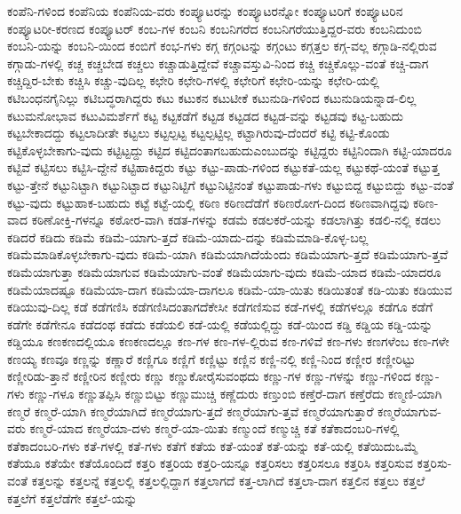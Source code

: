 {ಕಂಪೆನಿ-ಗಳಿಂದ
ಕಂಪೆನಿಯ
ಕಂಪೆನಿಯ-ವರು
ಕಂಪ್ಯೂಟರನ್ನು
ಕಂಪ್ಯೂಟರನ್ನೋ
ಕಂಪ್ಯೂಟರಿಗೆ
ಕಂಪ್ಯೂಟರಿನ
ಕಂಪ್ಯೂಟರೀ-ಕರಣದ
ಕಂಪ್ಯೂಟರ್
ಕಂಬ-ಗಳ
ಕಂಬನಿ
ಕಂಬನಿಗರೆದ
ಕಂಬನಿಗರೆಯುತ್ತಿದ್ದರ-ವರು
ಕಂಬನಿದುಂಬಿ
ಕಂಬನಿ-ಯನ್ನು
ಕಂಬನಿ-ಯಿಂದ
ಕಂಬಿಗೆ
ಕಂಭ-ಗಳು
ಕಗ್ಗ
ಕಗ್ಗಂಟನ್ನು
ಕಗ್ಗಂಟು
ಕಗ್ಗತ್ತಲ
ಕಗ್ಗ-ವಲ್ಲ
ಕಗ್ಗಾಡಿ-ನಲ್ಲಿರುವ
ಕಗ್ಗಾಡು-ಗಳಲ್ಲಿ
ಕಚ್ಚ
ಕಚ್ಚಬೇಡ
ಕಚ್ಚಲು
ಕಚ್ಚಾಡುತ್ತಿದ್ದೇವೆ
ಕಚ್ಚಾವಸ್ತುವಿ-ನಿಂದ
ಕಚ್ಚಿ
ಕಚ್ಚಿಕೊಲ್ಲು-ವಂತೆ
ಕಚ್ಚಿ-ದಾಗ
ಕಚ್ಚಿದ್ದಿರ-ಬೇಕು
ಕಚ್ಚಿಸಿ
ಕಚ್ಚು-ವುದಿಲ್ಲ
ಕಛೇರಿ
ಕಛೇರಿ-ಗಳಲ್ಲಿ
ಕಛೇರಿಗೆ
ಕಛೇರಿ-ಯನ್ನು
ಕಛೇರಿ-ಯಲ್ಲಿ
ಕಟಿಬಂಧನಗೈನಿಲ್ಲು
ಕಟಿಬದ್ಧರಾಗಿದ್ದರು
ಕಟು
ಕಟುಕನ
ಕಟುಟೀಕೆ
ಕಟುನುಡಿ-ಗಳಿಂದ
ಕಟುನುಡಿಯನ್ನಾಡ-ಲಿಲ್ಲ
ಕಟುಮನೋಭಾವ
ಕಟುವಿಮರ್ಶೆಗೆ
ಕಟ್ಟ
ಕಟ್ಟಕಡೆಗೆ
ಕಟ್ಟಡ
ಕಟ್ಟಡದ
ಕಟ್ಟಡ-ವನ್ನು
ಕಟ್ಟಡವು
ಕಟ್ಟ-ಬಹುದು
ಕಟ್ಟಬೇಕಾದದ್ದು
ಕಟ್ಟಲಾದೀತೇ
ಕಟ್ಟಲು
ಕಟ್ಟಲ್ಪಟ್ಟ
ಕಟ್ಟಲ್ಪಟ್ಟಿಲ್ಲ
ಕಟ್ಟಾಗಿರುವು-ದೆಂದರೆ
ಕಟ್ಟಿ
ಕಟ್ಟಿ-ಕೊಂಡು
ಕಟ್ಟಿಕೊಳ್ಳಬೇಕಾಗು-ವುದು
ಕಟ್ಟಿಟ್ಟದ್ದು
ಕಟ್ಟಿದ
ಕಟ್ಟಿದಂತಾಗಬಹುದುಎಂಬುದನ್ನು
ಕಟ್ಟಿದ್ದರು
ಕಟ್ಟಿನಿಂದಾಗಿ
ಕಟ್ಟಿ-ಯಾದರೂ
ಕಟ್ಟಿವೆ
ಕಟ್ಟಿಸಲು
ಕಟ್ಟಿಸಿ-ದ್ದೇನೆ
ಕಟ್ಟಿಹಾಕಿದ್ದರು
ಕಟ್ಟು
ಕಟ್ಟು-ಪಾಡು-ಗಳಿಂದ
ಕಟ್ಟುಕತೆ-ಯಲ್ಲ
ಕಟ್ಟುಕಥೆ-ಯಂತೆ
ಕಟ್ಟುತ್ತ
ಕಟ್ಟು-ತ್ತೇನೆ
ಕಟ್ಟುನಿಟ್ಟಾಗಿ
ಕಟ್ಟುನಿಟ್ಟಾದ
ಕಟ್ಟುನಿಟ್ಟಿಗೆ
ಕಟ್ಟುನಿಟ್ಟಿನಂತೆ
ಕಟ್ಟುಪಾಡು-ಗಳು
ಕಟ್ಟುಬಿದ್ದ
ಕಟ್ಟುಬಿದ್ದು
ಕಟ್ಟು-ವಂತೆ
ಕಟ್ಟು-ವುದು
ಕಟ್ಟುಹಾಕ-ಬಹುದು
ಕಟ್ಟೆ
ಕಟ್ಟೆ-ಯಲ್ಲಿ
ಕಠಿಣ
ಕಠಿಣದೆಡೆಗೆ
ಕಠಿಣರೋಗ-ದಿಂದ
ಕಠಿಣವಾಗಿದ್ದವು
ಕಠಿಣ-ವಾದ
ಕಠಿಣೋಕ್ತಿ-ಗಳನ್ನೂ
ಕಠೋರ-ವಾಗಿ
ಕಡತ-ಗಳನ್ನು
ಕಡಮೆ
ಕಡಲಕರೆ-ಯನ್ನು
ಕಡಲಾಗಿತ್ತು
ಕಡಲಿ-ನಲ್ಲಿ
ಕಡಲು
ಕಡಿದರೆ
ಕಡಿದು
ಕಡಿಮೆ
ಕಡಿಮೆ-ಯಾಗು-ತ್ತದೆ
ಕಡಿಮೆ-ಯಾದು-ದನ್ನು
ಕಡಿಮೆಮಾಡಿ-ಕೊಳ್ಳ-ಬಲ್ಲ
ಕಡಿಮೆಮಾಡಿಕೊಳ್ಳಬೇಕಾಗು-ವುದು
ಕಡಿಮೆ-ಯಾಗಿ
ಕಡಿಮೆಯಾಗಿದೆಯೆಂದು
ಕಡಿಮೆಯಾಗು-ತ್ತದೆ
ಕಡಿಮೆಯಾಗು-ತ್ತವೆ
ಕಡಿಮೆಯಾಗುತ್ತಾ
ಕಡಿಮೆಯಾಗುವ
ಕಡಿಮೆಯಾಗು-ವಂತೆ
ಕಡಿಮೆಯಾಗು-ವುದು
ಕಡಿಮೆ-ಯಾದ
ಕಡಿಮೆ-ಯಾದರೂ
ಕಡಿಮೆಯಾದಷ್ಟೂ
ಕಡಿಮೆಯಾ-ದಾಗ
ಕಡಿಮೆಯಾ-ದಾಗಲೂ
ಕಡಿಮೆ-ಯಾ-ಯಿತು
ಕಡಿಯಿತಂತೆ
ಕಡಿ-ಯಿತು
ಕಡಿಯುವ
ಕಡಿಯುವು-ದಿಲ್ಲ
ಕಡೆ
ಕಡೆಗಣಿಸಿ
ಕಡೆಗಣಿಸಿದಂತಾಗದೆಕೇಸೀ
ಕಡೆಗಣಿಸುವ
ಕಡೆ-ಗಳಲ್ಲಿ
ಕಡೆಗಳಲ್ಲೂ
ಕಡೆಗೂ
ಕಡೆಗೆ
ಕಡೆಗೇ
ಕಡೆಗೇನೂ
ಕಡೆದಂಥ
ಕಡೆದು
ಕಡೆಯಲಿ
ಕಡೆ-ಯಲ್ಲಿ
ಕಡೆಯಲ್ಲಿದ್ದು
ಕಡೆ-ಯಿಂದ
ಕಡ್ಡಿ
ಕಡ್ಡಿಯ
ಕಡ್ಡಿ-ಯನ್ನು
ಕಡ್ಡಿಯೂ
ಕಣಕಣದಲ್ಲಿಯೂ
ಕಣಕಣದಲ್ಲೂ
ಕಣ-ಗಳ
ಕಣ-ಗಳ-ಲ್ಲಿರುವ
ಕಣ-ಗಳಿವೆ
ಕಣ-ಗಳು
ಕಣಗಳೆಂಬ
ಕಣ-ಗಳೇ
ಕಣಯ್ಯ
ಕಣವೂ
ಕಣ್ಣನ್ನು
ಕಣ್ಣಾರೆ
ಕಣ್ಣಿಗೂ
ಕಣ್ಣಿಗೆ
ಕಣ್ಣಿಟ್ಟು
ಕಣ್ಣಿನ
ಕಣ್ಣಿ-ನಲ್ಲಿ
ಕಣ್ಣಿ-ನಿಂದ
ಕಣ್ಣೀರ
ಕಣ್ಣೀರಿಟ್ಟು
ಕಣ್ಣೀರಿಡು-ತ್ತಾನೆ
ಕಣ್ಣೀರಿನ
ಕಣ್ಣೀರು
ಕಣ್ಣು
ಕಣ್ಣುಕೋರೈಸುವಂಥದು
ಕಣ್ಣು-ಗಳ
ಕಣ್ಣು-ಗಳನ್ನು
ಕಣ್ಣು-ಗಳಿಂದ
ಕಣ್ಣು-ಗಳು
ಕಣ್ಣು-ಗಳೂ
ಕಣ್ಣುತಪ್ಪಿಸಿ
ಕಣ್ಣುಬಿಟ್ಟು
ಕಣ್ಣುಮುಚ್ಚಿ
ಕಣ್ಣೆದುರು
ಕಣ್ತುಂಬಿ
ಕಣ್ತೆರೆ-ದಾಗ
ಕಣ್ತೆರೆದು
ಕಣ್ಮಣಿ-ಯಾಗಿ
ಕಣ್ಮರೆ
ಕಣ್ಮರೆ-ಯಾಗಿ
ಕಣ್ಮರೆಯಾಗಿದೆ
ಕಣ್ಮರೆಯಾಗು-ತ್ತದೆ
ಕಣ್ಮರೆಯಾಗು-ತ್ತವೆ
ಕಣ್ಮರೆಯಾಗುತ್ತಾರೆ
ಕಣ್ಮರೆಯಾಗುವ-ವರು
ಕಣ್ಮರೆ-ಯಾದ
ಕಣ್ಮರೆಯಾ-ದಳು
ಕಣ್ಮರೆ-ಯಾ-ಯಿತು
ಕಣ್ಮುಂದೆ
ಕಣ್ಮುಚ್ಚಿ
ಕತೆ
ಕತೆಕಾದಂಬರಿ-ಗಳಲ್ಲಿ
ಕತೆಕಾದಂಬರಿ-ಗಳು
ಕತೆ-ಗಳಲ್ಲಿ
ಕತೆ-ಗಳು
ಕತೆಗೆ
ಕತೆಯ
ಕತೆ-ಯಂತೆ
ಕತೆ-ಯನ್ನು
ಕತೆ-ಯಲ್ಲಿ
ಕತೆಯಿದುಒಮ್ಮೆ
ಕತೆಯೂ
ಕತೆಯೇ
ಕತೆಯೊಂದಿದೆ
ಕತ್ತರಿ
ಕತ್ತರಿಯ
ಕತ್ತರಿ-ಯನ್ನೂ
ಕತ್ತರಿಸಲು
ಕತ್ತರಿಸಲೂ
ಕತ್ತರಿಸಿ
ಕತ್ತರಿಸುವ
ಕತ್ತರಿಸು-ವಂತೆ
ಕತ್ತಲನ್ನು
ಕತ್ತಲನ್ನೆ
ಕತ್ತಲಲ್ಲಿ
ಕತ್ತಲಲ್ಲಿದ್ದಾಗ
ಕತ್ತಲಾಗದೆ
ಕತ್ತ-ಲಾಗಿದೆ
ಕತ್ತಲಾ-ದಾಗ
ಕತ್ತಲಿನ
ಕತ್ತಲು
ಕತ್ತಲೆ
ಕತ್ತಲೆಗೆ
ಕತ್ತಲೆಡೆಗೇ
ಕತ್ತಲೆ-ಯನ್ನು
}
